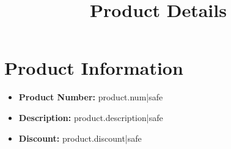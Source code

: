 \documentclass[12pt]{article}
\begin{document}
\title{Product Details}
\author{}
\date{}
\maketitle

\section*{Product Information}

\begin{itemize}
    \item \textbf{\large Product Number:} {{ product.num|safe }}
    \item \textbf{\large Description:} {{ product.description|safe }}
    \item \textbf{\large Discount:} {{ product.discount|safe }}
\end{itemize}
\end{document}
